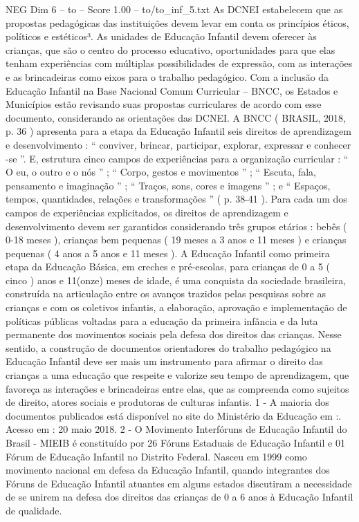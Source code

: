 \begin{textsample}{NEG Dim 6 – to – Score 1.00 – to/to\_inf\_5.txt}
As DCNEI estabelecem que as propostas pedagógicas das instituições devem levar em conta os princípios éticos, políticos e estéticos³.
As unidades de Educação Infantil devem oferecer às crianças, que são o centro do processo educativo, oportunidades para que elas tenham experiências com múltiplas possibilidades de expressão, com as interações e as brincadeiras como eixos para o trabalho pedagógico.
Com a inclusão da Educação Infantil na Base Nacional Comum Curricular – BNCC, os Estados e Municípios estão revisando suas propostas curriculares de acordo com esse documento, considerando as orientações das DCNEI.
A BNCC ( BRASIL, 2018, p. 36 ) apresenta para a etapa da Educação Infantil seis direitos de aprendizagem e desenvolvimento : “ conviver, brincar, participar, explorar, expressar e conhecer -se ”.
E, estrutura cinco campos de experiências para a organização curricular : “ O eu, o outro e o nós ” ; “ Corpo, gestos e movimentos ” ; “ Escuta, fala, pensamento e imaginação ” ; “ Traços, sons, cores e imagens ” ; e “ Espaços, tempos, quantidades, relações e transformações ” ( p. 38-41 ).
Para cada um dos campos de experiências explicitados, os direitos de aprendizagem e desenvolvimento devem ser garantidos considerando três grupos etários : bebês ( 0-18 meses ), crianças bem pequenas ( 19 meses a 3 anos e 11 meses ) e crianças pequenas ( 4 anos a 5 anos e 11 meses ).
A Educação Infantil como primeira etapa da Educação Básica, em creches e pré-escolas, para crianças de 0 a 5 ( cinco ) anos e 11(onze) meses de idade, é uma conquista da sociedade brasileira, construída na articulação entre os avanços trazidos pelas pesquisas sobre as crianças e com os coletivos infantis, a elaboração, aprovação e implementação de políticas públicas voltadas para a educação da primeira infância e da luta permanente dos movimentos sociais pela defesa dos direitos das crianças.
Nesse sentido, a construção de documentos orientadores do trabalho pedagógico na Educação Infantil deve ser mais um instrumento para afirmar o direito das crianças a uma educação que respeite e valorize seu tempo de aprendizagem, que favoreça as interações e brincadeiras entre elas, que as compreenda como sujeitos de direito, atores sociais e produtoras de culturas infantis. 1 - A maioria dos documentos publicados está disponível no site do Ministério da Educação em :.
Acesso em : 20 maio 2018. 2 - O Movimento Interfóruns de Educação Infantil do Brasil - MIEIB é constituído por 26 Fóruns Estaduais de Educação Infantil e 01 Fórum de Educação Infantil no Distrito Federal.
Nasceu em 1999 como movimento nacional em defesa da Educação Infantil, quando integrantes dos Fóruns de Educação Infantil atuantes em alguns estados discutiram a necessidade de se unirem na defesa dos direitos das crianças de 0 a 6 anos à Educação Infantil de qualidade.

\end{textsample}

